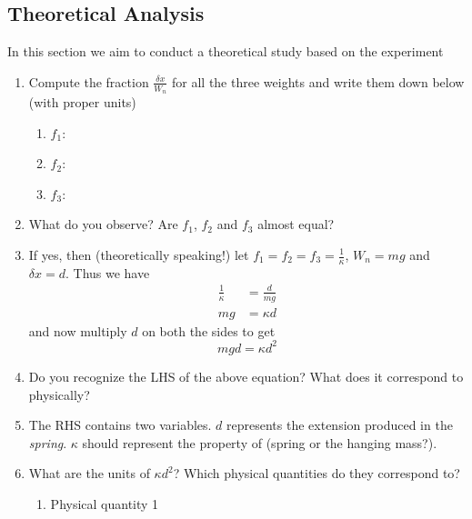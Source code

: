 \documentclass[10pt]{article}
\begin{document}
\subsection{Theoretical Analysis}
In this section we aim to conduct a theoretical study based on the experiment
\begin{enumerate}
\item Compute the fraction $\frac{\delta x}{W_n}$ for all the three weights and write them down below (with proper units)
\vspace{100px}
  \begin{enumerate}
  \item $f_1$:\underline{\hspace{5cm}}
  \item $f_2$:\underline{\hspace{5cm}}
  \item $f_3$:\underline{\hspace{5cm}}  
  \end{enumerate}
\item What do you observe?  Are $f_1$, $f_2$ and $f_3$ almost equal? 
\vspace{50px}
\item If yes, then (theoretically speaking!) let $f_1=f_2=f_3=\frac{1}{\kappa}$, $W_n=mg$ and $\delta x = d$.  Thus we have 
  \begin{equation}
    \begin{split}
      \frac{1}{\kappa} &= \frac{d}{mg}\\
      mg &= \kappa d
    \end{split}
  \end{equation}
and now multiply $d$ on both the sides to get 
\begin{equation}
\label{gravwork}
mgd = \kappa d^2 
\end{equation}
\item Do you recognize the LHS of the above equation?  What does it correspond to physically?
\vspace{50px}
\item The RHS contains two variables.  $d$ represents the extension produced in the \emph{spring}.  $\kappa$ should represent the property of \underline{\hspace{5cm}} (spring or the hanging mass?).
\item What are the units of $\kappa d^2$?  Which physical quantities do they correspond to?
\vspace{50px}
\begin{enumerate}
\item Physical quantity 1 \underline{\hspace{5cm}}

\end{enumerate}
\end{enumerate}
\end{document}

